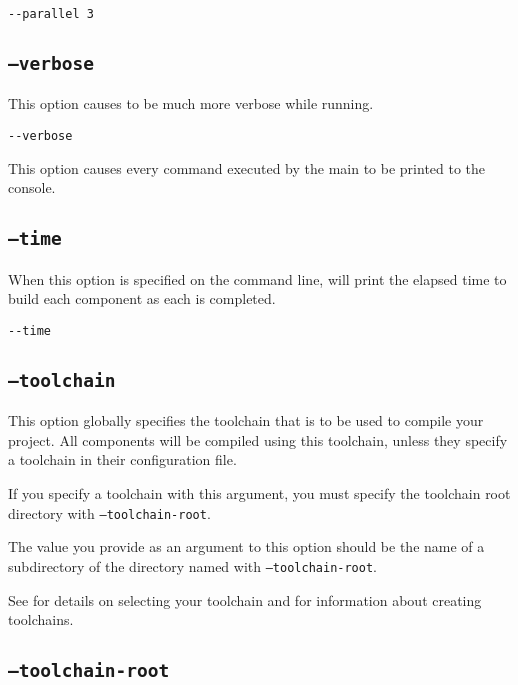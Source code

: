 \begin{verbatim}
--parallel 3
\end{verbatim}

\subsection{\texttt{--verbose}}

This option causes \lmsbw to be much more verbose while running.

\begin{verbatim}
--verbose
\end{verbatim}

This option causes every command executed by the main \makefile to be
printed to the console.

\subsection{\texttt{--time}}

When this option is specified on the command line, \lmsbw will print
the elapsed time to build each component as each is completed.

\begin{verbatim}
--time
\end{verbatim}

\subsection{\texttt{--toolchain}}\label{usinglmsbw:toolchain}

This option globally specifies the toolchain that is to be used to
compile your project.  All components will be compiled using this
toolchain, unless they specify a toolchain in their configuration
file.

If you specify a toolchain with this argument, you must specify the
toolchain root directory with \texttt{--toolchain-root}.

The value you provide as an argument to this option should be the name
of a subdirectory of the directory named with
\texttt{--toolchain-root}.

See  for details on selecting your
toolchain and  for information
about creating toolchains.

\subsection{\texttt{--toolchain-root}}\label{usinglmsbw:toolchain-root}

